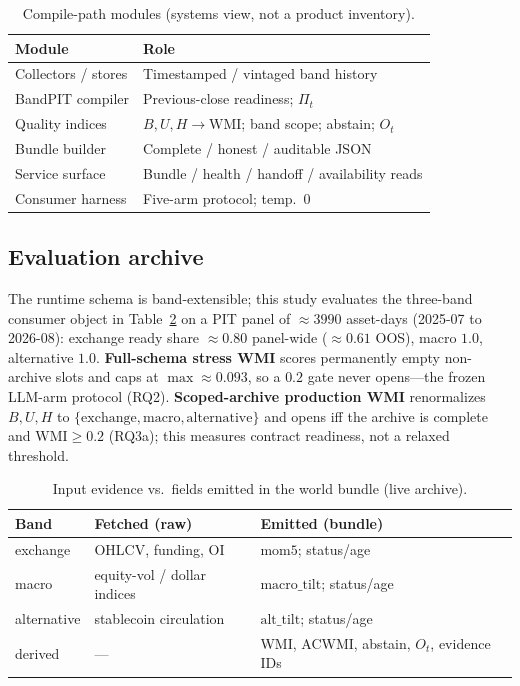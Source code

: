 \documentclass[sigconf,anonymous]{acmart}
\theoremstyle{acmdefinition}%
\theoremstyle{acmplain}%
\begin{document}
\begin{table}[ht]
  \caption{Compile-path modules (systems view, not a product inventory).}
  \label{tab:modules}
  \small
  \begin{tabular}{@{}p{}p{}@{}}
    \toprule
    Module & Role \\
    \midrule
    Collectors / stores & Timestamped / vintaged band history \\
    BandPIT compiler & Previous-close readiness; \(\Pi_t\) \\
    Quality indices & \(B,U,H\rightarrow\mathrm{WMI}\); band scope; abstain; \(O_t\) \\
    Bundle builder & Complete / honest / auditable JSON \\
    Service surface & Bundle / health / handoff / availability reads \\
    Consumer harness & Five-arm protocol; temp.\ \(0\) \\
    \bottomrule
  \end{tabular}
\end{table}

\subsection{Evaluation archive}
The runtime schema is band-extensible; this study evaluates the three-band consumer object in Table~\ref{tab:dataflow} on a PIT panel of \({\approx}3990\) asset-days (2025-07 to 2026-08): exchange ready share \({\approx}0.80\) panel-wide (\({\approx}0.61\) OOS), macro \(1.0\), alternative \(1.0\).
\textbf{Full-schema stress WMI} scores permanently empty non-archive slots and caps at \(\max{\approx}0.093\), so a \(0.2\) gate never opens---the frozen LLM-arm protocol (RQ2).
\textbf{Scoped-archive production WMI} renormalizes \(B,U,H\) to \(\{\mathrm{exchange},\mathrm{macro},\mathrm{alternative}\}\) and opens iff the archive is complete and \(\mathrm{WMI}\ge 0.2\) (RQ3a); this measures contract readiness, not a relaxed threshold.

\begin{table}[ht]
  \caption{Input evidence vs.\ fields emitted in the world bundle (live archive).}
  \label{tab:dataflow}
  \small
  \begin{tabular}{@{}p{}p{}p{}@{}}
    \toprule
    Band & Fetched (raw) & Emitted (bundle) \\
    \midrule
    exchange & OHLCV, funding, OI & \(\mathrm{mom5}\); status/age \\
    macro & equity-vol / dollar indices & \(\mathrm{macro\_tilt}\); status/age \\
    alternative & stablecoin circulation & \(\mathrm{alt\_tilt}\); status/age \\
    derived & --- & WMI, ACWMI, abstain, \(O_t\), evidence IDs \\
    \bottomrule
  \end{tabular}
\end{table}
\end{document}
